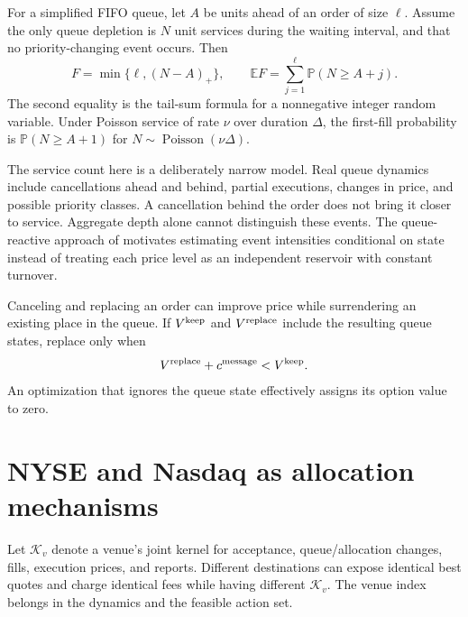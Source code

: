 \documentclass[11pt]{article}
\numberwithin{equation}{section}
\theoremstyle{definition}
\theoremstyle{remark}
\newcommand{\E}{\mathbb{E}}
\theoremstyle{definition}
\newcommand{\Pp}{\mathbb P}
\newcommand{\K}{\mathcal K}
\begin{document}
For a simplified FIFO queue, let $A$ be units ahead of an order of size $\ell$.
Assume the only queue depletion is $N$ unit services during the waiting interval,
and that no priority-changing event occurs. Then
\begin{equation}\label{eq:fifo}
 F=\min\{\ell,(N-A)_+\},\qquad
 \E F=\sum_{j=1}^{\ell}\Pp(N\geq A+j).
\end{equation}
The second equality is the tail-sum formula for a nonnegative integer random
variable. Under Poisson service of rate $\nu$ over duration $\Delta$,
the first-fill probability is $\Pp(N\geq A+1)$ for
$N\sim\operatorname{Poisson}(\nu\Delta)$.

The service count here is a deliberately narrow model. Real queue dynamics
include cancellations ahead and behind, partial executions, changes in price,
and possible priority classes. A cancellation behind the order does not bring
it closer to service. Aggregate depth alone cannot distinguish these events.
The queue-reactive approach of \citet{huang2015} motivates estimating event
intensities conditional on state instead of treating each price level as an
independent reservoir with constant turnover.

Canceling and replacing an order can improve price while surrendering an
existing place in the queue. If $V^{\rm keep}$ and $V^{\rm replace}$ include
the resulting queue states, replace only when
\begin{equation}
 V^{\rm replace}+c^{\rm message}<V^{\rm keep}.
\end{equation}
An optimization that ignores the queue state effectively assigns its option
value to zero.

\section{NYSE and Nasdaq as allocation mechanisms}\label{sec:venues}

Let $\K_v$ denote a venue's joint kernel for acceptance, queue/allocation changes,
fills, execution prices, and reports. Different destinations can expose identical
best quotes and charge identical fees while having different $\K_v$. The venue
index belongs in the dynamics and the feasible action set.
\end{document}
